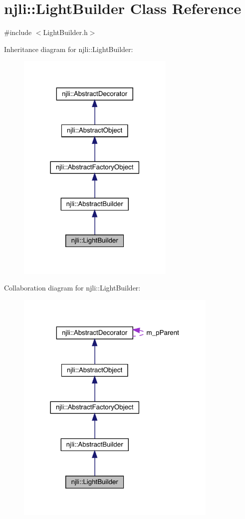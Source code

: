 \hypertarget{classnjli_1_1_light_builder}{}\section{njli\+:\+:Light\+Builder Class Reference}
\label{classnjli_1_1_light_builder}


{\ttfamily \#include $<$Light\+Builder.\+h$>$}



Inheritance diagram for njli\+:\+:Light\+Builder\+:\nopagebreak
\begin{figure}[H]
\begin{center}
\leavevmode
\includegraphics[width=213pt]{classnjli_1_1_light_builder__inherit__graph}
\end{center}
\end{figure}


Collaboration diagram for njli\+:\+:Light\+Builder\+:\nopagebreak
\begin{figure}[H]
\begin{center}
\leavevmode
\includegraphics[width=273pt]{classnjli_1_1_light_builder__coll__graph}
\end{center}
\end{figure}
